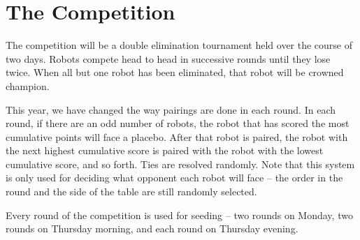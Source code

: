 \section{The Competition}

The competition will be a double elimination tournament held over the
course of two days.  Robots compete head to head in successive rounds
until they lose twice.  When all but one robot has been eliminated,
that robot will be crowned champion.

This year, we have changed the way pairings are done in each round.
In each round, if there are an odd number of robots, the robot that
has scored the most cumulative points will face a placebo.  After that
robot is paired, the robot with the next highest cumulative score is
paired with the robot with the lowest cumulative score, and so forth.
Ties are resolved randomly.  Note that this system is only used for
deciding what opponent each robot will face -- the order in the round
and the side of the table are still randomly selected.

Every round of the competition is used for seeding -- two rounds on
Monday, two rounds on Thursday morning, and each round on Thursday
evening.


